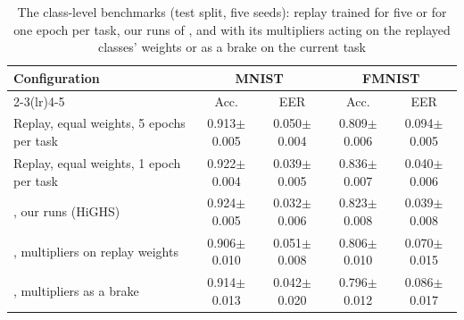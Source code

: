 \begin{table}[t]
\centering
\caption{The class-level benchmarks (test split, five seeds): replay trained for five or for one epoch per task, our runs of \fsw{}, and \method{} with its multipliers acting on the replayed classes' weights or as a brake on the current task}\label{tab:ablation-eer}
\footnotesize
\setlength{\tabcolsep}{4pt}
\begin{tabular}{lcccc}
\toprule
Configuration & \multicolumn{2}{c}{MNIST} & \multicolumn{2}{c}{FMNIST} \\ \cmidrule(lr){2-3}\cmidrule(lr){4-5} & Acc. & EER & Acc. & EER \\
\midrule
Replay, equal weights, 5 epochs per task & 0.913\tiny{$\pm$0.005} & 0.050\tiny{$\pm$0.004} & 0.809\tiny{$\pm$0.006} & 0.094\tiny{$\pm$0.005} \\
Replay, equal weights, 1 epoch per task & 0.922\tiny{$\pm$0.004} & 0.039\tiny{$\pm$0.005} & 0.836\tiny{$\pm$0.007} & 0.040\tiny{$\pm$0.006} \\
\fsw{}, our runs (HiGHS) & 0.924\tiny{$\pm$0.005} & 0.032\tiny{$\pm$0.006} & 0.823\tiny{$\pm$0.008} & 0.039\tiny{$\pm$0.008} \\
\method{}, multipliers on replay weights & 0.906\tiny{$\pm$0.010} & 0.051\tiny{$\pm$0.008} & 0.806\tiny{$\pm$0.010} & 0.070\tiny{$\pm$0.015} \\
\method{}, multipliers as a brake & 0.914\tiny{$\pm$0.013} & 0.042\tiny{$\pm$0.020} & 0.796\tiny{$\pm$0.012} & 0.086\tiny{$\pm$0.017} \\
\bottomrule
\end{tabular}
\end{table}
